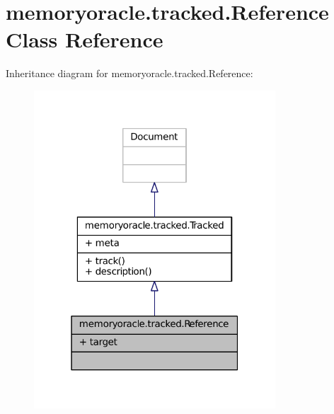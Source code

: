 \hypertarget{classmemoryoracle_1_1tracked_1_1Reference}{}\section{memoryoracle.\+tracked.\+Reference Class Reference}
\label{classmemoryoracle_1_1tracked_1_1Reference}


Inheritance diagram for memoryoracle.\+tracked.\+Reference\+:
\nopagebreak
\begin{figure}[H]
\begin{center}
\leavevmode
\includegraphics[width=256pt]{classmemoryoracle_1_1tracked_1_1Reference__inherit__graph}
\end{center}
\end{figure}



